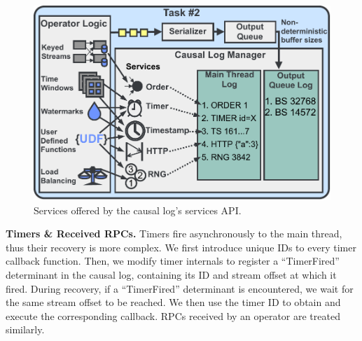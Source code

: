 \documentclass[sigconf]{acmart}
\newcommand{\para}[1]{\vspace{1mm}\noindent\textbf{#1.}}
\begin{document}
\begin{figure}[t]
  \centering
  \includegraphics[width=0.8\columnwidth]{Figures/services.pdf}
\vspace{-2mm}
  \caption{Services offered by the causal log's services API.}
\label{fig:causal_log}
\vspace{-4mm}
\end{figure}





\para{Timers \& Received RPCs} Timers fire asynchronously to the main thread, thus their recovery is more complex. We first introduce unique IDs to every timer callback function. Then, we modify timer internals to register a ``TimerFired'' determinant in the causal log, containing its ID and stream offset at which it fired.
During recovery, if a ``TimerFired'' determinant is encountered, we wait for the same stream offset to be reached. We then use the timer ID to obtain and execute the corresponding callback. RPCs received by an operator are treated similarly.
\end{document}
